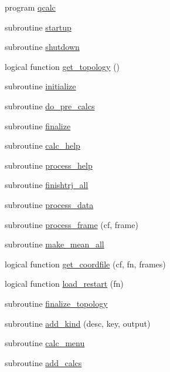 \begin{DoxyCompactItemize}
\item 
program \hyperlink{qcalc_8f90_af9a59510ab33b6a61b0bffe1e6679be1}{qcalc}
\item 
subroutine \hyperlink{qcalc_8f90_a1c4c0aa57a695916669518b5bf72e5bb}{startup}
\item 
subroutine \hyperlink{qcalc_8f90_ab8b2551c119768488c4ce752918274a6}{shutdown}
\item 
logical function \hyperlink{qcalc_8f90_aacaa8facde5f0fb39d3129c9777ca2d6}{get\-\_\-topology} ()
\item 
subroutine \hyperlink{qcalc_8f90_abfa70c406b1c701bcea2c55234d0642d}{initialize}
\item 
subroutine \hyperlink{qcalc_8f90_a6de35d783d8e2c1ffead6a9dbf61ebb6}{do\-\_\-pre\-\_\-calcs}
\item 
subroutine \hyperlink{qcalc_8f90_ae13666592a639e38acc4462b8e5ec488}{finalize}
\item 
subroutine \hyperlink{qcalc_8f90_a0916b2e52eb485b7c054ceeaa3bcc6bc}{calc\-\_\-help}
\item 
subroutine \hyperlink{qcalc_8f90_accba7d2752af0a562a170bd24016fc8b}{process\-\_\-help}
\item 
subroutine \hyperlink{qcalc_8f90_ae9f414aacd475e3507c1adf33981cabf}{finishtrj\-\_\-all}
\item 
subroutine \hyperlink{qcalc_8f90_a7d2d447954fb385bdca4f228de92b1eb}{process\-\_\-data}
\item 
subroutine \hyperlink{qcalc_8f90_a93dcacb957411ed0d0471fe8a31c60d6}{process\-\_\-frame} (cf, frame)
\item 
subroutine \hyperlink{qcalc_8f90_a164c08954086777fab0abf50fc431b85}{make\-\_\-mean\-\_\-all}
\item 
logical function \hyperlink{qcalc_8f90_a1d82cd2a089e1e0ca370862a88297fad}{get\-\_\-coordfile} (cf, fn, frames)
\item 
logical function \hyperlink{qcalc_8f90_a26df16bfa0021f6226b26f2e715cdb91}{load\-\_\-restart} (fn)
\item 
subroutine \hyperlink{qcalc_8f90_ad7e945159c2c3479ab13f7fe344ed0ac}{finalize\-\_\-topology}
\item 
subroutine \hyperlink{qcalc_8f90_a9afc3a2b4bf9cf9f8ae01bac7640ab19}{add\-\_\-kind} (desc, key, output)
\item 
subroutine \hyperlink{qcalc_8f90_abb9b8f865767a4df227883c541fbda4a}{calc\-\_\-menu}
\item 
subroutine \hyperlink{qcalc_8f90_acaadc7e7a89c09e2f5d003ad5dca1672}{add\-\_\-calcs}

\end{DoxyCompactItemize}

